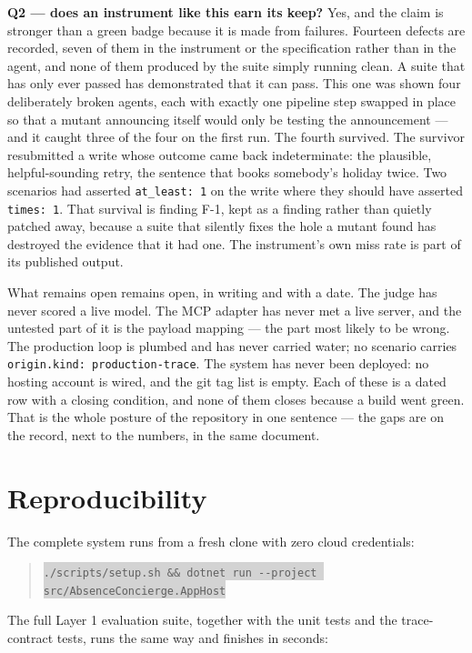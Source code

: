 \documentclass[11pt,a4paper]{article}
\newcommand{\repopath}[1]{\colorbox{lightgray}{\texttt{#1}}}
\begin{document}
\textbf{Q2 --- does an instrument like this earn its keep?} Yes, and the claim
is stronger than a green badge because it is made from failures. Fourteen defects
are recorded, seven of them in the instrument or the specification rather than
in the agent, and none of them produced by the suite simply running clean. A
suite that has only ever passed has demonstrated that it can pass. This one was
shown four deliberately broken agents, each with exactly one pipeline step
swapped in place so that a mutant announcing itself would only be testing the
announcement --- and it caught three of the four on the first run. The fourth
survived. The survivor resubmitted a write whose outcome came back
indeterminate: the plausible, helpful-sounding retry, the sentence that books
somebody's holiday twice. Two scenarios had asserted \texttt{at\_least: 1} on
the write where they should have asserted \texttt{times: 1}. That survival is
finding F-1, kept as a finding rather than quietly patched away, because a suite
that silently fixes the hole a mutant found has destroyed the evidence that it
had one. The instrument's own miss rate is part of its published output.

What remains open remains open, in writing and with a date. The judge has never
scored a live model. The MCP adapter has never met a live server, and the
untested part of it is the payload mapping --- the part most likely to be wrong.
The production loop is plumbed and has never carried water; no scenario carries
\texttt{origin.kind: production-trace}. The system has never been deployed: no
hosting account is wired, and the git tag list is empty. Each of these is a
dated row with a closing condition, and none of them closes because a build went
green. That is the whole posture of the repository in one sentence --- the gaps
are on the record, next to the numbers, in the same document.

\section*{Reproducibility}

The complete system runs from a fresh clone with zero cloud credentials:

\begin{quote}
\repopath{./scripts/setup.sh \&\& dotnet run -{}-project src/AbsenceConcierge.AppHost}
\end{quote}

\noindent The full Layer 1 evaluation suite, together with the unit tests and
the trace-contract tests, runs the same way and finishes in seconds:
\end{document}
